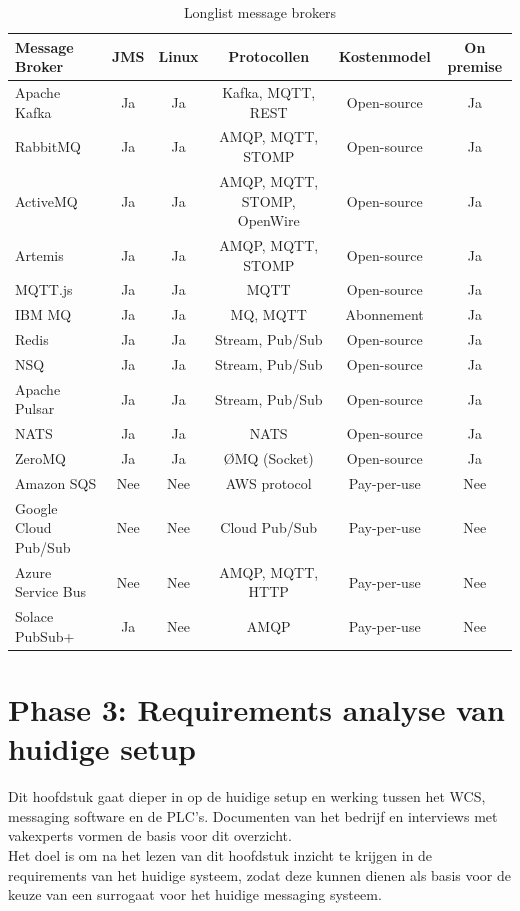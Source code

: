 \begin{table}[!h]
\footnotesize
\centering
\begin{tabular}{|l|c|c|c|c|c|}
\hline
Message Broker & JMS & Linux & Protocollen & Kostenmodel & On premise \\
\hline
Apache Kafka & Ja & Ja & Kafka, MQTT, REST & Open-source & Ja \\
\hline
RabbitMQ & Ja & Ja & AMQP, MQTT, STOMP & Open-source & Ja \\
\hline
ActiveMQ & Ja & Ja & AMQP, MQTT, STOMP, OpenWire & Open-source & Ja \\ 
\hline
Artemis & Ja & Ja & AMQP, MQTT, STOMP & Open-source & Ja \\
\hline
MQTT.js & Ja & Ja & MQTT & Open-source & Ja \\
\hline
IBM MQ & Ja & Ja & MQ, MQTT & Abonnement & Ja \\
\hline
Redis & Ja & Ja & Stream, Pub/Sub & Open-source & Ja \\
\hline
NSQ & Ja & Ja & Stream, Pub/Sub & Open-source & Ja \\
\hline
Apache Pulsar & Ja & Ja & Stream, Pub/Sub & Open-source & Ja \\
\hline
NATS & Ja & Ja & NATS & Open-source & Ja \\
\hline
ZeroMQ & Ja & Ja & ØMQ (Socket) & Open-source & Ja \\ 
\hline
Amazon SQS & Nee & Nee & AWS protocol & Pay-per-use & Nee \\
\hline
Google Cloud Pub/Sub & Nee & Nee & Cloud Pub/Sub & Pay-per-use & Nee \\
\hline
Azure Service Bus & Nee & Nee & AMQP, MQTT, HTTP & Pay-per-use & Nee \\
\hline
Solace PubSub+ & Ja & Nee & AMQP & Pay-per-use & Nee \\
\hline
\end{tabular}
\caption{\label{tab:message_brokers}Longlist message brokers}
\end{table}

\section{Phase 3: Requirements analyse van huidige setup}
Dit hoofdstuk gaat dieper in op de huidige setup en werking tussen het WCS, messaging software en de PLC's.
Documenten van het bedrijf en interviews met vakexperts vormen de basis voor dit overzicht.
\\
Het doel is om na het lezen van dit hoofdstuk inzicht te krijgen in de requirements van het huidige systeem, 
zodat deze kunnen dienen als basis voor de keuze van een surrogaat voor het huidige messaging systeem.

